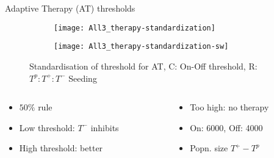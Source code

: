 \begin{frame}{Adaptive Therapy (AT) thresholds}
  \begin{figure}[h]
    \centering
    \begin{subfigure}[b]{0.48\textwidth}
      \centering
      \texttt{[image: All3\_therapy-standardization]}
    \end{subfigure}
    \begin{subfigure}[b]{0.48\textwidth}
      \centering
      \texttt{[image: All3\_therapy-standardization-sw]}
    \end{subfigure}
    \caption{Standardisation of threshold for AT, C: On-Off threshold, R: $T^p:T^+:T^-$ Seeding}
  \end{figure}
  \begin{columns}
    \begin{column}{0.5\textwidth}
      \begin{itemize}
        \item $50\%$ rule
        \item Low threshold: $T^-$ inhibits
        \item High threshold: better \cite{Hansen}
      \end{itemize}
    \end{column}
    \begin{column}{0.5\textwidth}
      \begin{itemize}
        \item Too high: no therapy
        \item On: 6000, Off: 4000
        \item Popn. size $T^+ - T^p$
      \end{itemize}
    \end{column}
  \end{columns}
\end{frame}

